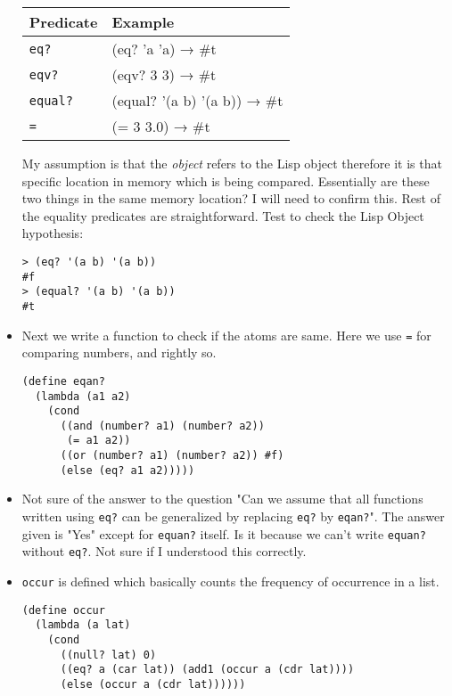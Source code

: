 \documentclass[11pt]{article}
\begin{document}
\begin{itemize}
\bigskip

\begin{center}
\begin{tabular}{ll}
Predicate & Example\\[0pt]
\hline
\texttt{eq?} & (eq? 'a 'a) → \#t\\[0pt]
\texttt{eqv?} & (eqv? 3 3) → \#t\\[0pt]
\texttt{equal?} & (equal? '(a b) '(a b)) → \#t\\[0pt]
\texttt{=} & (= 3 3.0) → \#t\\[0pt]
\end{tabular}
\end{center}

My assumption is that the \emph{object} refers to the Lisp object therefore it is that specific location in memory which is being compared. Essentially are these two
things in the same memory location? I will need to confirm this. Rest of the equality predicates are straightforward. Test to check the Lisp Object hypothesis:
\begin{verbatim}
> (eq? '(a b) '(a b))
#f
> (equal? '(a b) '(a b))
#t

\end{verbatim}

\item Next we write a function to check if the atoms are same. Here we use \texttt{=} for comparing numbers, and rightly so.
\begin{verbatim}
(define eqan?
  (lambda (a1 a2)
    (cond
      ((and (number? a1) (number? a2))
       (= a1 a2))
      ((or (number? a1) (number? a2)) #f)
      (else (eq? a1 a2)))))

\end{verbatim}

\item Not sure of the answer to the question "Can we assume that all functions written using \texttt{eq?} can be generalized by replacing \texttt{eq?} by \texttt{eqan?}". The answer
given is "Yes" except for \texttt{equan?} itself. Is it because we can't write \texttt{equan?} without \texttt{eq?}. Not sure if I understood this correctly.

\item \texttt{occur} is defined which basically counts the frequency of occurrence in a list.
\begin{verbatim}
(define occur
  (lambda (a lat)
    (cond
      ((null? lat) 0)
      ((eq? a (car lat)) (add1 (occur a (cdr lat))))
      (else (occur a (cdr lat))))))


\end{verbatim}
\end{itemize}
\end{document}
